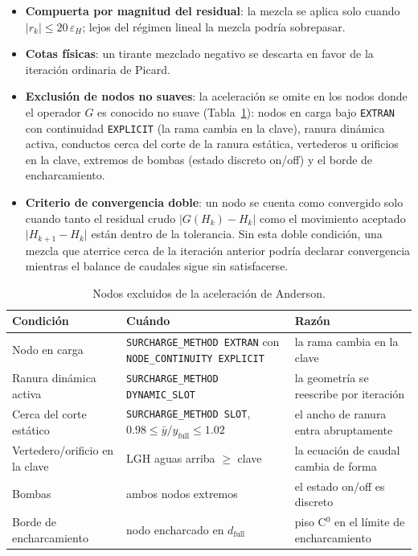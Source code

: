 \documentclass[11pt,a4paper]{article}
\begin{document}
\begin{itemize}[nosep]
  \item \textbf{Compuerta por magnitud del residual}: la mezcla se aplica solo
        cuando $\lvert r_k \rvert \le 20\,\varepsilon_H$; lejos del régimen
        lineal la mezcla podría sobrepasar.
  \item \textbf{Cotas físicas}: un tirante mezclado negativo se descarta en
        favor de la iteración ordinaria de Picard.
  \item \textbf{Exclusión de nodos no suaves}: la aceleración se omite en los
        nodos donde el operador $G$ es conocido no suave (Tabla~\ref{tab:aa}):
        nodos en carga bajo \texttt{EXTRAN} con continuidad \texttt{EXPLICIT}
        (la rama cambia en la clave), ranura dinámica activa, conductos cerca
        del corte de la ranura estática, vertederos u orificios en la clave,
        extremos de bombas (estado discreto on/off) y el borde de
        encharcamiento.
  \item \textbf{Criterio de convergencia doble}: un nodo se cuenta como
        convergido solo cuando tanto el residual crudo $\lvert G(H_k) - H_k
        \rvert$ como el movimiento aceptado $\lvert H_{k+1} - H_k \rvert$ están
        dentro de la tolerancia. Sin esta doble condición, una mezcla que
        aterrice cerca de la iteración anterior podría declarar convergencia
        mientras el balance de caudales sigue sin satisfacerse.
\end{itemize}

\begin{table}[H]
\centering
\small
\begin{tabular}{>{\raggedright}p{3.4cm}>{\raggedright}p{6.0cm}>{\raggedright\arraybackslash}p{5.4cm}}
\toprule
\textbf{Condición} & \textbf{Cuándo} & \textbf{Razón} \\
\midrule
Nodo en carga & \texttt{SURCHARGE\_METHOD EXTRAN} con
  \texttt{NODE\_CONTINUITY EXPLICIT} & la rama cambia en la clave \\
Ranura dinámica activa & \texttt{SURCHARGE\_METHOD DYNAMIC\_SLOT} & la geometría
  se reescribe por iteración \\
Cerca del corte estático & \texttt{SURCHARGE\_METHOD SLOT}, $0.98 \le
  \bar y/y_{\mathrm{full}} \le 1.02$ & el ancho de ranura entra abruptamente \\
Vertedero/orificio en la clave & LGH aguas arriba $\ge$ clave & la ecuación de
  caudal cambia de forma \\
Bombas & ambos nodos extremos & el estado on/off es discreto \\
Borde de encharcamiento & nodo encharcado en $d_{\mathrm{full}}$ & piso C$^0$ en
  el límite de encharcamiento \\
\bottomrule
\end{tabular}
\caption{Nodos excluidos de la aceleración de Anderson.}
\label{tab:aa}
\end{table}
\end{document}
